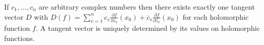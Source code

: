 If $c_1, \ldots, c_n$ are arbitrary complex numbers then there exists exactly one tangent vector $D$ with $D(f) = \sum_{v=1}^{n} c_v \frac{\partial f}{\partial z_v}(x_0) + \overline{c}_v \frac{\partial f}{\partial \overline{z}_v}(x_0)$ for each holomorphic function $f$. A tangent vector is uniquely determined by its values on holomorphic functions.
